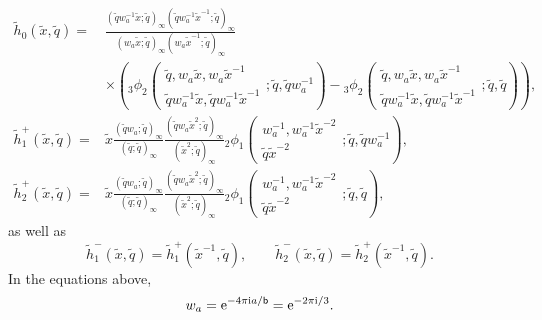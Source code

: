\documentclass[a4paper,11pt]{article}
\theoremstyle{definition}
\newcommand{\re}{{\rm e}}
\newcommand{\ri}{{\rm i}}
\def\tq{{\tilde{q}}}
\def\tx{{\tilde{x}}}
\newcommand{\be}{\begin{equation}}
\newcommand{\ee}{\end{equation}}
\newcommand{\bb}{\mathsf{b}}
\newcommand{\nn}{\nonumber \\}
\newcommand{\qhg}[6]{{}_#1\phi_{#2}
  \left(\begin{matrix}
    #3  \\
    #4
  \end{matrix} ; #5, #6\right)}
\begin{document}
\begin{subequations}
\begin{align}
  \tilde{h}_0(\tx,\tq) =
  &\frac{(\tq w_a^{-1} \tx;\tq)_\infty
    (\tq w_a^{-1}\tx^{-1};\tq)_\infty}
    {(w_a \tx;\tq)_\infty(w_a \tx^{-1};\tq)_\infty} \nn
    &\times 
    \left(
    \qhg{3}{2}{\tq,w_a\tx,w_a\tx^{-1}}
    {\tq w_a^{-1}\tx,\tq  w_a^{-1}\tx^{-1}}{\tq}{\tq w_a^{-1}} -
    \qhg{3}{2}{\tq,w_a\tx,w_a\tx^{-1}}
    {\tq w_a^{-1}\tx,\tq w_a^{-1}\tx^{-1}}{\tq}{\tq} 
    \right),\\
  \tilde{h}^+_1(\tx,\tq) =
  &\tx\frac{(\tq w_a;\tq)_\infty}{(\tq;\tq)_\infty}
    \frac{(\tq w_a\tx^2;\tq)_\infty}{(\tx^2;\tq)_\infty}
    \qhg{2}{1}{w_a^{-1},w_a^{-1}\tx^{-2}}{\tq\tx^{-2}}{\tq}{\tq w_a^{-1}},
  \\
  \tilde{h}^+_2(\tx,\tq) =
  &\tx\frac{(\tq w_a;\tq)_\infty}{(\tq;\tq)_\infty}
    \frac{(\tq w_a\tx^2;\tq)_\infty}{(\tx^2;\tq)_\infty}
    \qhg{2}{1}{w_a^{-1},w_a^{-1}\tx^{-2}}{\tq\tx^{-2}}{\tq}{\tq},
 \end{align}
\end{subequations}
%
as well as 
  \be
  \tilde{h}^-_1(\tx,\tq) =
  \tilde{h}^+_1(\tx^{-1},\tq),\qquad
    \tilde{h}^-_2(\tx,\tq) = \tilde{h}^+_2(\tx^{-1},\tq). 
    \ee
In the equations above, 
%
\begin{equation}
  w_a = \re^{-4\pi\ri a/\bb} = \re^{-2\pi\ri/3}.
\end{equation}
%
\end{document}
